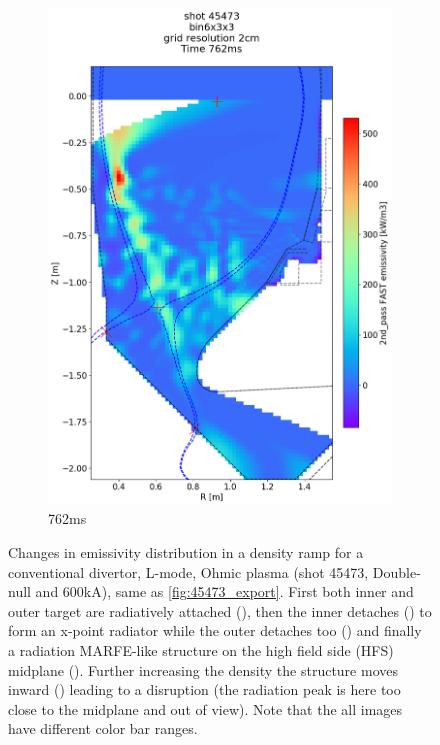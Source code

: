 \begin{figure}
\begin{subfigure}{0.395\linewidth}
         \includegraphics[trim={5 90 0 190},clip,width=\textwidth]{Chapters/chapter2/figs/IRVB-MASTU_shot-45473_export_76.png}
         \vspace*{-6.5mm}
         \caption{762ms}
         \label{fig:45473_export2_5}
     \end{subfigure}
    \vspace*{-3mm}
    \caption{Changes in emissivity distribution in a density ramp for a conventional divertor, L-mode, Ohmic plasma (shot 45473, Double-null and 600kA), same as \autoref{fig:45473_export}. First both inner and outer target are radiatively attached (), then the inner detaches () to form an x-point radiator while the outer detaches too () and finally a radiation MARFE-like structure on the high field side (HFS) midplane (). Further increasing the density the structure moves inward () leading to a disruption (the radiation peak is here too close to the midplane and out of view). Note that the all images have different color bar ranges.}
    \label{fig:45473_export2}
\end{figure}

